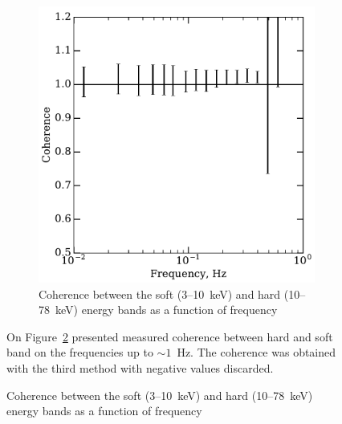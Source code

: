 \begin{figure}
\begin{figure}
    \includegraphics[width=\columnwidth]{coherence_grs.pdf}
    \caption{Coherence between the soft (3--10~keV) and hard (10--78~keV) energy bands as a function of frequency} 
    \label{fig:coherence}
\end{figure}


On Figure~\ref{fig:coherence} presented measured coherence between hard and soft band on the frequencies up to $\sim1$~Hz. 
The coherence was obtained with the third method with negative values discarded. 




\end{figure}

